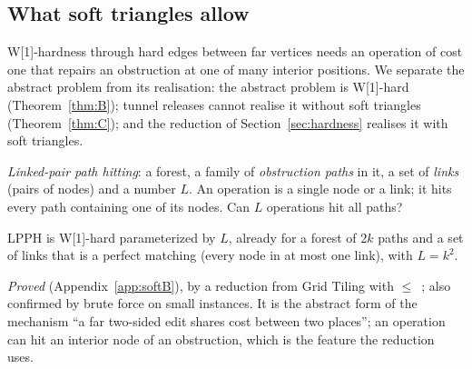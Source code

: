 \subsection{What soft triangles allow}\label{sec:softhard}
W[1]-hardness through hard edges between far vertices needs an operation of cost one that repairs an obstruction at one of many interior positions. We separate the abstract problem from its realisation: the abstract problem is W[1]-hard (Theorem~\ref{thm:B}); tunnel releases cannot realise it without soft triangles (Theorem~\ref{thm:C}); and the reduction of Section~\ref{sec:hardness} realises it with soft triangles.
\begin{definition}[LPPH]
\emph{Linked-pair path hitting}: a forest, a family of \emph{obstruction paths} in it, a set of \emph{links} (pairs of nodes) and a number $L$. An operation is a single node or a link; it hits every path containing one of its nodes. Can $L$ operations hit all paths?
\end{definition}
\begin{theorem}\label{thm:B}
LPPH is W[1]-hard parameterized by $L$, already for a forest of $2k$ paths and a set of links that is a perfect matching (every node in at most one link), with $L=k^2$.
\end{theorem}
\emph{Proved} (Appendix~\ref{app:softB}), by a reduction from Grid Tiling with $\le$~\cite{Cygan15}; also confirmed by brute force on small instances. It is the abstract form of the mechanism ``a far two-sided edit shares cost between two places''; an operation can hit an interior node of an obstruction, which is the feature the reduction uses.

